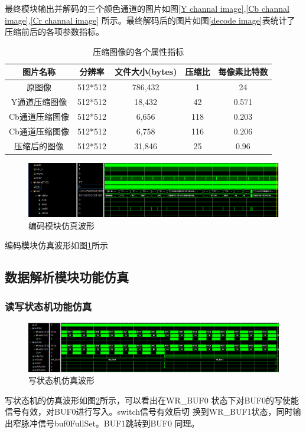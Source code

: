 \documentclass{article}
\numberwithin {equation}{section}
\begin{document}
\begin{spacing}{1.25}
  最终模块输出并解码的三个颜色通道的图片如图\ref{Y channal image},\ref{Cb channal image},\ref{Cr channal image}
  所示。最终解码后的图片如图\ref{decode image}表统计了压缩前后的各项参数指标。

  \begin{table}[H]
    \caption{压缩图像的各个属性指标}
    \label{image vs}
    \centering
    \begin{tabular}{ccccc}
      \toprule
      图片名称 & 分辨率 & 文件大小(bytes) & 压缩比 & 每像素比特数\\
      \midrule
      原图像 & 512*512 & 786,432 & 1 & 24\\
      Y通道压缩图像 & 512*512 & 18,432 & 42 & 0.571\\
      Cb通道压缩图像 & 512*512 & 6,656 & 118 & 0.203\\
      Cb通道压缩图像 & 512*512 & 6,758 & 116 & 0.206\\
      压缩后的图像 & 512*512 & 31,846 & 25 & 0.96\\
      \bottomrule
    \end{tabular}
  \end{table}
  \begin{figure}[H]
    \centering
    \includegraphics[scale=0.30]{./pictures/top_wave.png}
    \caption{编码模块仿真波形}
    \label{top_wave}
  \end{figure}
  编码模块仿真波形如图\ref{top_wave}所示
  \subsection{数据解析模块功能仿真}
    \vspace{1em}
    \subsubsection{读写状态机功能仿真}
      \vspace{1em}
      \begin{figure}[H]
        \centering
        \includegraphics[scale=0.25]{./pictures/wrFSMSim.png}
        \caption{写状态机仿真波形}
        \label{WRFSMSimWave}
      \end{figure}
      写状态机的仿真波形如图\ref{WRFSMSimWave}所示，可以看出在WR\_BUF0
      状态下对BUF0的写使能信号有效，对BUF0进行写入。switch信号有效后切
      换到WR\_BUF1状态，同时输出窄脉冲信号buf0FullSet。BUF1跳转到BUF0
      同理。
      

\end{spacing}
\end{document}
